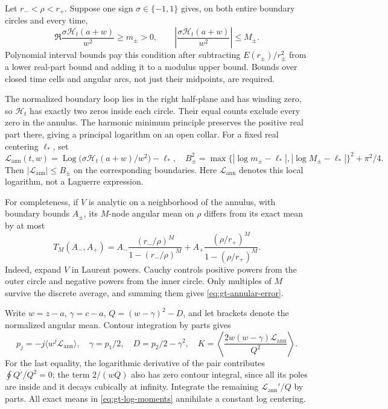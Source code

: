Let \(r_-<\rho<r_+\). Suppose one sign \(\sigma\in\{-1,1\}\)
gives, on both entire boundary circles and every time,
\begin{equation}
 \Re\frac{\sigma\mathcal H_t(a+w)}{w^2}\ge m_\pm>0,\qquad
 \left|\frac{\sigma\mathcal H_t(a+w)}{w^2}\right|\le M_\pm .
 \label{eq:gt-half-plane}
\end{equation}
Polynomial interval bounds pay this condition after subtracting
\(E(r_\pm)/r_\pm^2\) from a lower real-part bound and adding it to a
modulus upper bound. Bounds over closed time cells and angular arcs,
not just their midpoints, are required.

The normalized boundary loop lies in the right half-plane and has
winding zero, so \(\mathcal H_t\) has exactly two zeros inside each
circle. Their equal counts exclude every zero in the annulus.
The harmonic minimum principle preserves the positive real part there,
giving a principal logarithm on an open collar. For a fixed real
centering \(\ell_*\), set
\[
 \mathcal L_{\mathrm{ann}}(t,w)=
 \operatorname{Log}\bigl(\sigma\mathcal H_t(a+w)/w^2\bigr)-\ell_*,
 \quad
 B_\pm^2=
 \max\{|\log m_\pm-\ell_*|,|\log M_\pm-\ell_*|\}^2+\pi^2/4.
\]
Then \(|\mathcal L_{\mathrm{ann}}|\le B_\pm\) on the corresponding boundaries.
Here \(\mathcal L_{\mathrm{ann}}\) denotes this local logarithm, not a Laguerre expression.

For completeness, if \(V\) is analytic on a neighborhood of the annulus,
with boundary bounds \(A_\pm\), its \(M\)-node angular mean on \(\rho\)
differs from its exact mean by at most
\begin{equation}
 T_M(A_-,A_+)=
 A_-\frac{(r_-/\rho)^M}{1-(r_-/\rho)^M}
 +A_+\frac{(\rho/r_+)^M}{1-(\rho/r_+)^M}.
 \label{eq:gt-annular-error}
\end{equation}
Indeed, expand \(V\) in Laurent powers. Cauchy controls positive powers
from the outer circle and negative powers from the inner circle.
Only multiples of \(M\) survive the discrete average, and summing them
gives \eqref{eq:gt-annular-error}.

Write \(w=z-a\), \(\gamma=c-a\), \(Q=(w-\gamma)^2-D\), and let brackets
denote the normalized angular mean. Contour integration by parts gives
\begin{equation}
 p_j=-j\langle w^j\mathcal L_{\mathrm{ann}}\rangle,\quad
 \gamma=p_1/2,\quad D=p_2/2-\gamma^2,\quad
 K=\left\langle\frac{2w(w-\gamma)\mathcal L_{\mathrm{ann}}}{Q^2}\right\rangle.
 \label{eq:gt-log-moments}
\end{equation}
For the last equality, the logarithmic derivative of the pair contributes
\(\oint Q'/Q^2=0\); the term \(2/(wQ)\) also has zero contour integral,
since all its poles are inside and it decays cubically at infinity.
Integrate the remaining \(\mathcal L_{\mathrm{ann}}'/Q\) by parts. All exact means in
\eqref{eq:gt-log-moments} annihilate a constant log centering.

